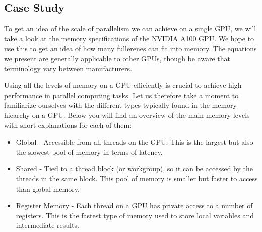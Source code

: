 \subsection{Case Study}

To get an idea of the scale of parallelism we can achieve on a single GPU, we will take a look at the memory specifications of the NVIDIA A100 GPU. We hope to use this to get an idea of how many fullerenes can fit into memory. The equations we present are generally applicable to other GPUs, though be aware that terminology vary between manufacturers.

Using all the levels of memory on a GPU efficiently is crucial to achieve high performance in parallel computing tasks. Let us therefore take a moment to familiarize ourselves with the different types typically found in the memory hiearchy on a GPU. Below you will find an overview of the main memory levels with short explanations for each of them:

\begin{itemize}
  \item Global - Accessible from all threads on the GPU. This is the largest but also the slowest pool of memory in terms of latency.
  \item Shared - Tied to a thread block (or workgroup), so it can be accessed by the threads in the same block. This pool of memory is smaller but faster to access than global memory.
  \item Register Memory - Each thread on a GPU has private access to a number of registers. This is the fastest type of memory used to store local variables and intermediate results.
\end{itemize}


